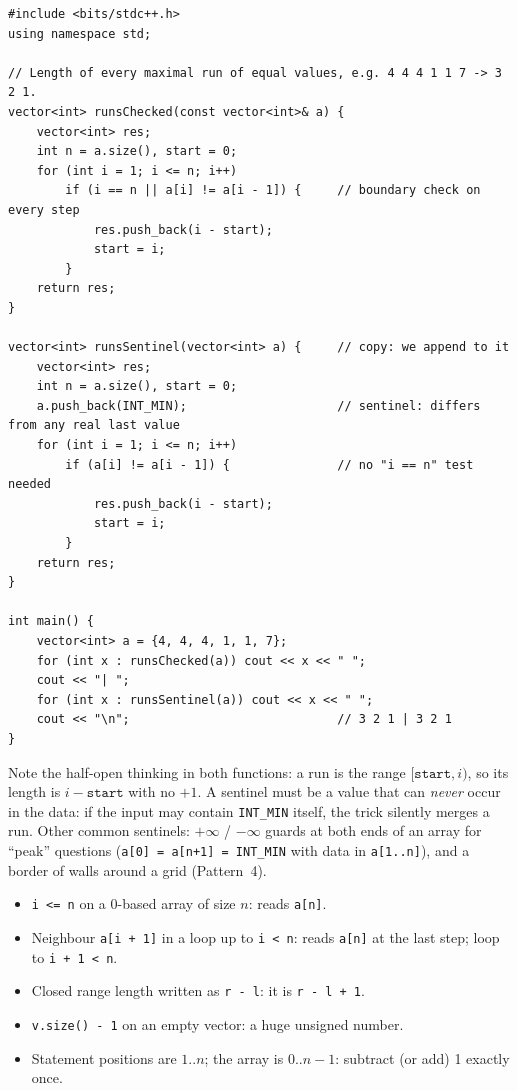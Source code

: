 \begin{lstlisting}[style=cpp]
#include <bits/stdc++.h>
using namespace std;

// Length of every maximal run of equal values, e.g. 4 4 4 1 1 7 -> 3 2 1.
vector<int> runsChecked(const vector<int>& a) {
    vector<int> res;
    int n = a.size(), start = 0;
    for (int i = 1; i <= n; i++)
        if (i == n || a[i] != a[i - 1]) {     // boundary check on every step
            res.push_back(i - start);
            start = i;
        }
    return res;
}

vector<int> runsSentinel(vector<int> a) {     // copy: we append to it
    vector<int> res;
    int n = a.size(), start = 0;
    a.push_back(INT_MIN);                     // sentinel: differs from any real last value
    for (int i = 1; i <= n; i++)
        if (a[i] != a[i - 1]) {               // no "i == n" test needed
            res.push_back(i - start);
            start = i;
        }
    return res;
}

int main() {
    vector<int> a = {4, 4, 4, 1, 1, 7};
    for (int x : runsChecked(a)) cout << x << " ";
    cout << "| ";
    for (int x : runsSentinel(a)) cout << x << " ";
    cout << "\n";                             // 3 2 1 | 3 2 1
}
\end{lstlisting}

Note the half-open thinking in both functions: a run is the range $[\texttt{start}, i)$, so its length is $i - \texttt{start}$ with no $+1$. A sentinel must be a value that can \emph{never} occur in the data: if the input may contain \texttt{INT\_MIN} itself, the trick silently merges a run. Other common sentinels: $+\infty$ / $-\infty$ guards at both ends of an array for ``peak'' questions (\texttt{a[0] = a[n+1] = INT\_MIN} with data in \texttt{a[1..n]}), and a border of walls around a grid (Pattern~4).

\begin{warningbox}
\begin{itemize}[leftmargin=*]
    \item \texttt{i <= n} on a 0-based array of size $n$: reads \texttt{a[n]}.
    \item Neighbour \texttt{a[i + 1]} in a loop up to \texttt{i < n}: reads \texttt{a[n]} at the last step; loop to \texttt{i + 1 < n}.
    \item Closed range length written as \texttt{r - l}: it is \texttt{r - l + 1}.
    \item \texttt{v.size() - 1} on an empty vector: a huge unsigned number.
    \item Statement positions are $1..n$; the array is $0..n-1$: subtract (or add) 1 exactly once.
\end{itemize}
\end{warningbox}


